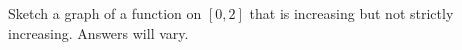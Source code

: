 {Sketch a graph of a function on $[0,2]$ that is increasing but not strictly increasing.
}
{Answers will vary.
}
